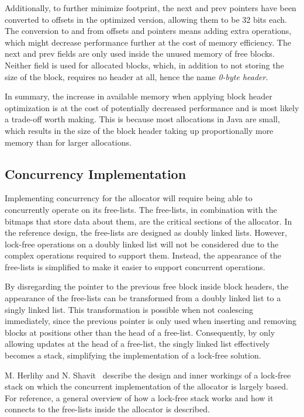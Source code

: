 Additionally, to further minimize footprint, the next and prev pointers have been converted to offsets in the optimized version, allowing them to be 32 bits each. The conversion to and from offsets and pointers means adding extra operations, which might decrease performance further at the cost of memory efficiency. The next and prev fields are only used inside the unused memory of free blocks. Neither field is used for allocated blocks, which, in addition to not storing the size of the block, requires no header at all, hence the name \textit{0-byte header}.

In summary, the increase in available memory when applying block header optimization is at the cost of potentially decreased performance and is most likely a trade-off worth making. This is because most allocations in Java are small, which results in the size of the block header taking up proportionally more memory than for larger allocations.

\subsection{Concurrency Implementation}
\label{sec:adaptations_impl:concurrency}

Implementing concurrency for the allocator will require being able to concurrently operate on its free-lists. The free-lists, in combination with the bitmaps that store data about them, are the critical sections of the allocator. In the reference design, the free-lists are designed as doubly linked lists. However, lock-free operations on a doubly linked list will not be considered due to the complex operations required to support them. Instead, the appearance of the free-lists is simplified to make it easier to support concurrent operations.

By disregarding the pointer to the previous free block inside block headers, the appearance of the free-lists can be transformed from a doubly linked list to a singly linked list. This transformation is possible when not coalescing immediately, since the previous pointer is only used when inserting and removing blocks at positions other than the head of a free-list. Consequently, by only allowing updates at the head of a free-list, the singly linked list effectively becomes a stack, simplifying the implementation of a lock-free solution.

M. Herlihy and N. Shavit~\cite[Chapter 11]{artofmpprogramming} describe the design and inner workings of a lock-free stack on which the concurrent implementation of the allocator is largely based. For reference, a general overview of how a lock-free stack works and how it connects to the free-lists inside the allocator is described.

